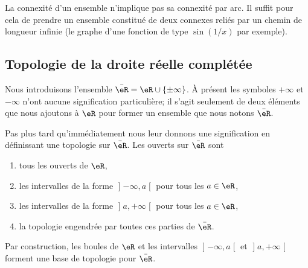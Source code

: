\begin{normaltext}      \label{NORMooQXKVooXOmMlX}
    La connexité d'un ensemble n'implique pas sa connexité par arc. Il suffit pour cela de prendre un ensemble constitué de deux connexes reliés par un chemin de longueur infinie (le graphe d'une fonction de type \( \sin(1/x)\) par exemple).
\end{normaltext}


\subsection{Topologie de la droite réelle complétée}
\label{SUBSECooKRRUooSlZSmM}

Nous introduisons l'ensemble \( \bar\eR=\eR\cup\{ \pm\infty \}\). À présent les symboles \( +\infty\) et \( -\infty\) n'ont aucune signification particulière; il s'agit seulement de deux éléments que nous ajoutons à \( \eR\) pour former un ensemble que nous notons \( \bar \eR\).

Pas plus tard qu'immédiatement nous leur donnons une signification en définissant une topologie sur \( \bar\eR\). Les ouverts sur \( \bar \eR\) sont
\begin{enumerate}
    \item
        tous les ouverts de \( \eR\),
    \item
        les intervalles de la forme \( \mathopen] -\infty , a \mathclose[\) pour tous les \( a\in \eR\),
    \item
        les intervalles de la forme \( \mathopen] a , +\infty \mathclose[\) pour tous les \( a\in \eR\),
    \item
        la topologie engendrée par toutes ces parties de \( \bar \eR\).
\end{enumerate}

Par construction, les boules de \( \eR\) et les intervalles \( \mathopen] -\infty , a \mathclose[\) et \( \mathopen] a , +\infty \mathclose[\) forment une base de topologie pour \( \bar \eR\).

